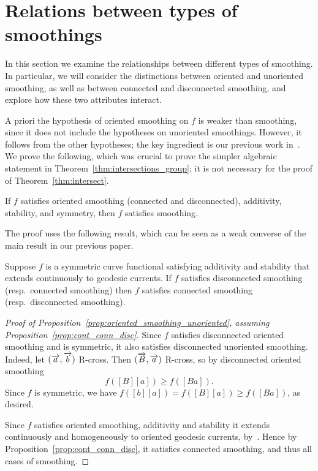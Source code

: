 \section{Relations between types of smoothings}
\label{sec:smoothing-types}

In this section we examine the relationships between different types of smoothing. In particular, we will consider the distinctions between oriented and unoriented smoothing, as well as between connected and disconnected smoothing, and explore how these two attributes interact.

A priori the hypothesis of oriented smoothing on $f$ is weaker than
smoothing, since it does not include the hypotheses on unoriented smoothings.
However, it follows from the other hypotheses; the key ingredient is
our previous work in~\cite{MGT21:Smoothings}. We prove the following,
which was crucial to prove the simpler algebraic statement in
Theorem~\ref{thm:intersections_group}; it is not necessary for the
proof of Theorem~\ref{thm:intersect}.
\begin{proposition}
If $f$ satisfies oriented smoothing
(connected and disconnected), additivity,
stability, and symmetry, then $f$ satisfies smoothing.
\label{prop:oriented_smoothing_unoriented}
\end{proposition}

The proof uses the following result, which can be seen as a weak
converse of the main result in our previous paper. 
\begin{proposition}
Suppose $f$ is a symmetric curve functional satisfying additivity and stability that extends continuously to geodesic currents.
If $f$ satisfies disconnected smoothing (resp.\ connected smoothing) then $f$ satisfies connected smoothing (resp.\ disconnected smoothing).
\label{prop:cont_conn_disc}
\end{proposition}

\begin{proof}[Proof of
  Proposition~\ref{prop:oriented_smoothing_unoriented}, assuming Proposition~\ref{prop:cont_conn_disc}]
  Since $f$ satisfies disconnected oriented smoothing and is
  symmetric, it also
  satisfies disconnected unoriented smoothing. Indeed, let
  $(\overrightarrow{a},\overrightarrow{b})$ R-cross. Then $(\overrightarrow{B},\overrightarrow{a})$ R-cross, so by
  disconnected oriented smoothing
\[
f([B][a]) \geq f([Ba]).
\]
Since $f$ is symmetric, we have $f([b][a])=f([B][a]) \geq
f([Ba])$, as desired.

Since $f$ satisfies oriented smoothing, additivity and stability it extends continuously and homogeneously
to oriented geodesic currents, by~\cite[Theorem~A]{MGT21:Smoothings}. Hence by
Proposition~\ref{prop:cont_conn_disc}, it satisfies connected
smoothing, and thus all cases of smoothing.
\end{proof}

